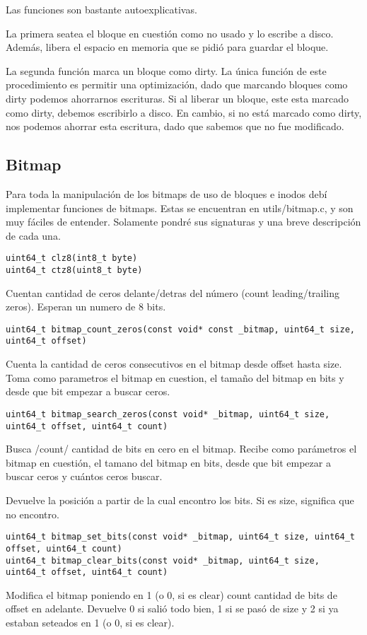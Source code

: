 Las funciones son bastante autoexplicativas.

La primera seatea el bloque en cuestión como no usado y lo escribe a disco. Además, libera el espacio en memoria que se pidió para guardar el bloque.

La segunda función marca un bloque como dirty. La única función de este procedimiento es permitir una optimización, dado que marcando bloques como dirty podemos ahorrarnos escrituras.
Si al liberar un bloque, este esta marcado como dirty, debemos escribirlo a disco. En cambio, si no está marcado como dirty, nos podemos ahorrar esta escritura, dado que sabemos que no fue modificado.


\subsection{Bitmap}

Para toda la manipulación de los bitmaps de uso de bloques e inodos debí implementar funciones de bitmaps. Estas se encuentran en utils/bitmap.c, y son muy fáciles de entender. Solamente pondré sus signaturas y una breve descripción de cada una.


\begin{lstlisting}[style=customc]
uint64_t clz8(int8_t byte)
uint64_t ctz8(uint8_t byte)
\end{lstlisting}

Cuentan cantidad de ceros delante/detras del número (count leading/trailing zeros). Esperan un numero de 8 bits.




\begin{lstlisting}[style=customc]
uint64_t bitmap_count_zeros(const void* const _bitmap, uint64_t size, uint64_t offset)
\end{lstlisting}

Cuenta la cantidad de ceros consecutivos en el bitmap desde offset hasta size.
Toma como parametros el bitmap en cuestion, el tamaño del bitmap en bits y desde que bit empezar a buscar ceros.



\begin{lstlisting}[style=customc]
uint64_t bitmap_search_zeros(const void* _bitmap, uint64_t size, uint64_t offset, uint64_t count)
\end{lstlisting}
Busca /count/ cantidad de bits en cero en el bitmap. Recibe como parámetros el bitmap en cuestión, el tamano del bitmap en bits, desde que bit empezar a buscar ceros y cuántos ceros buscar.

Devuelve la posición a partir de la cual encontro los bits. Si es size, significa que no encontro.



\begin{lstlisting}[style=customc]
uint64_t bitmap_set_bits(const void* _bitmap, uint64_t size, uint64_t offset, uint64_t count)
uint64_t bitmap_clear_bits(const void* _bitmap, uint64_t size, uint64_t offset, uint64_t count)
\end{lstlisting}

Modifica el bitmap poniendo en 1 (o 0, si es clear) count cantidad de bits de offset en adelante.
Devuelve 0 si salió todo bien, 1 si se pasó de size y 2 si ya estaban seteados en 1 (o 0, si es clear).

